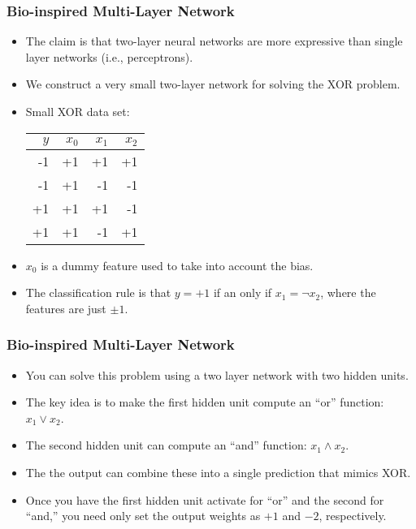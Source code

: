 \documentclass[trans]{beamer}
\begin{document}
\begin{frame}
  \frametitle{Bio-inspired Multi-Layer Network}
\begin{itemize}
\item
The claim is that two-layer neural networks are more expressive than
single layer networks (i.e., perceptrons).
\item We construct a very small two-layer network for solving the XOR problem.
\item
Small XOR data set:
\begin{tabular}{r|rrr}
  $y$ & $x_0$ & $x_1$ & $x_2$ \\
  \hline
  -1 & +1 & +1 & +1 \\
  -1 & +1 & -1 & -1 \\
  +1 & +1 & +1 & -1 \\
  +1 & +1 & -1 & +1
\end{tabular}
\item $x_0$ is a dummy feature used to take into account the bias.
\item The classification rule is
that $y=+1$ if an only if $x_1=\neg x_2$, where the features are just $\pm
1$.
\end{itemize}
\end{frame}

\begin{frame}
  \frametitle{Bio-inspired Multi-Layer Network}
\begin{itemize}
\item
You can solve this problem using a two layer network with two hidden
units.
\item  The key idea is to make the first hidden unit compute an
``or'' function: $x_1 \lor x_2$. 
\item The second hidden unit can compute
an ``and'' function: $x_1 \land x_2$. 
\item The the output can combine
these into a single prediction that mimics XOR. 
\item  Once you have the
first hidden unit activate for ``or'' and the second for ``and,'' you
need only set the output weights as $+1$ and $-2$, respectively.
\end{itemize}
\end{frame}
\end{document}
